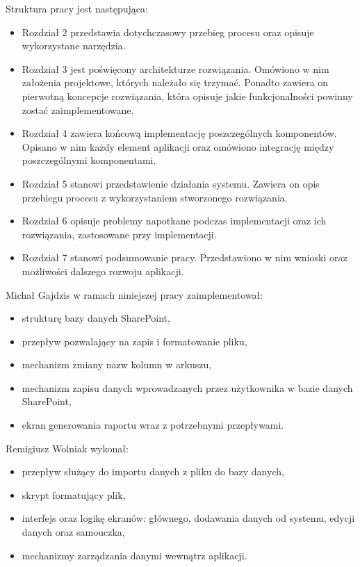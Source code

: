 \pagebreak
Struktura pracy jest następująca:
\begin{itemize}
\item Rozdział 2  przedstawia dotychczasowy przebieg procesu oraz opisuje wykorzystane narzędzia.

\item Rozdział 3 jest poświęcony architekturze rozwiązania. Omówiono w nim założenia projektowe, których należało się trzymać. Ponadto zawiera on pierwotną koncepcje rozwiązania, która opisuje jakie funkcjonalności powinny zostać zaimplementowane.

\item Rozdział 4 zawiera końcową implementację poszczególnych komponentów. Opisano w nim każdy element aplikacji oraz omówiono integrację między poszczególnymi komponentami.

\item Rozdział 5 stanowi przedstawienie działania systemu. Zawiera on opis przebiegu procesu z wykorzystaniem stworzonego rozwiązania.

\item Rozdział 6 opisuje problemy napotkane podczas implementacji oraz ich rozwiązania, zastosowane przy implementacji.

\item Rozdział 7 stanowi podsumowanie pracy. Przedstawiono w nim wnioski oraz możliwości dalszego rozwoju aplikacji.
\end{itemize}

\vspace{0.5cm}
\noindent Michał Gajdzis w ramach niniejszej pracy zaimplementował:
\begin{itemize}
    \item strukturę bazy danych SharePoint,
    \item przepływ pozwalający na zapis i formatowanie pliku,
    \item mechanizm zmiany nazw kolumn w arkuszu,
    \item mechanizm zapisu danych wprowadzanych przez użytkownika w bazie danych SharePoint,
    \item ekran generowania raportu wraz z potrzebnymi przepływami.
\end{itemize}

\vspace{0.5cm}
\noindent Remigiusz Wolniak wykonał:
\begin{itemize}
    \item przepływ służący do importu danych z pliku do bazy danych,
    \item skrypt formatujący plik,
    \item interfejs oraz logikę ekranów: głównego, dodawania danych od systemu, edycji danych oraz samouczka,
    \item mechanizmy zarządzania danymi wewnątrz aplikacji.
\end{itemize}